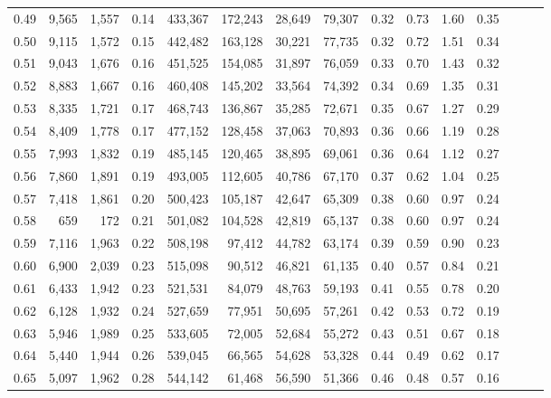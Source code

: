 \begin{tabular}{rrrrrrrrrrrrrrr}
0.49 &   9,565 &  1,557 &  0.14 &  433,367 &  172,243 &   28,649 &   79,307 &  0.32 &  0.73 &  1.60 &      0.35 \\
0.50 &   9,115 &  1,572 &  0.15 &  442,482 &  163,128 &   30,221 &   77,735 &  0.32 &  0.72 &  1.51 &      0.34 \\
0.51 &   9,043 &  1,676 &  0.16 &  451,525 &  154,085 &   31,897 &   76,059 &  0.33 &  0.70 &  1.43 &      0.32 \\
0.52 &   8,883 &  1,667 &  0.16 &  460,408 &  145,202 &   33,564 &   74,392 &  0.34 &  0.69 &  1.35 &      0.31 \\
0.53 &   8,335 &  1,721 &  0.17 &  468,743 &  136,867 &   35,285 &   72,671 &  0.35 &  0.67 &  1.27 &      0.29 \\
0.54 &   8,409 &  1,778 &  0.17 &  477,152 &  128,458 &   37,063 &   70,893 &  0.36 &  0.66 &  1.19 &      0.28 \\
0.55 &   7,993 &  1,832 &  0.19 &  485,145 &  120,465 &   38,895 &   69,061 &  0.36 &  0.64 &  1.12 &      0.27 \\
0.56 &   7,860 &  1,891 &  0.19 &  493,005 &  112,605 &   40,786 &   67,170 &  0.37 &  0.62 &  1.04 &      0.25 \\
0.57 &   7,418 &  1,861 &  0.20 &  500,423 &  105,187 &   42,647 &   65,309 &  0.38 &  0.60 &  0.97 &      0.24 \\
0.58 &     659 &    172 &  0.21 &  501,082 &  104,528 &   42,819 &   65,137 &  0.38 &  0.60 &  0.97 &      0.24 \\
0.59 &   7,116 &  1,963 &  0.22 &  508,198 &   97,412 &   44,782 &   63,174 &  0.39 &  0.59 &  0.90 &      0.23 \\
0.60 &   6,900 &  2,039 &  0.23 &  515,098 &   90,512 &   46,821 &   61,135 &  0.40 &  0.57 &  0.84 &      0.21 \\
0.61 &   6,433 &  1,942 &  0.23 &  521,531 &   84,079 &   48,763 &   59,193 &  0.41 &  0.55 &  0.78 &      0.20 \\
0.62 &   6,128 &  1,932 &  0.24 &  527,659 &   77,951 &   50,695 &   57,261 &  0.42 &  0.53 &  0.72 &      0.19 \\
0.63 &   5,946 &  1,989 &  0.25 &  533,605 &   72,005 &   52,684 &   55,272 &  0.43 &  0.51 &  0.67 &      0.18 \\
0.64 &   5,440 &  1,944 &  0.26 &  539,045 &   66,565 &   54,628 &   53,328 &  0.44 &  0.49 &  0.62 &      0.17 \\
0.65 &   5,097 &  1,962 &  0.28 &  544,142 &   61,468 &   56,590 &   51,366 &  0.46 &  0.48 &  0.57 &      0.16 \\

\end{tabular}
